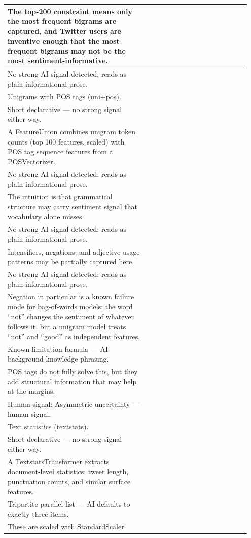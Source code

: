 \documentclass[11pt]{article}
\begin{document}
\begin{longtable}{|p{0.55\linewidth}|p{0.40\linewidth}|}
\hline
The top-200 constraint means only the most frequent bigrams are captured, and Twitter users are inventive enough that the most frequent bigrams may not be the most sentiment-informative. & \\[2pt]
\hline
No strong AI signal detected; reads as plain informational prose. & \\
\hline
Unigrams with POS tags (uni+pos). & \\[2pt]
\hline
Short declarative --- no strong signal either way. & \\
\hline
A FeatureUnion combines unigram token counts (top 100 features, scaled) with POS tag sequence features from a POSVectorizer. & \\[2pt]
\hline
No strong AI signal detected; reads as plain informational prose. & \\
\hline
The intuition is that grammatical structure may carry sentiment signal that vocabulary alone misses. & \\[2pt]
\hline
No strong AI signal detected; reads as plain informational prose. & \\
\hline
Intensifiers, negations, and adjective usage patterns may be partially captured here. & \\[2pt]
\hline
No strong AI signal detected; reads as plain informational prose. & \\
\hline
Negation in particular is a known failure mode for bag-of-words models: the word ``not'' changes the sentiment of whatever follows it, but a unigram model treats ``not'' and ``good'' as independent features. & \\[2pt]
\hline
Known limitation formula --- AI background-knowledge phrasing. & \\
\hline
POS tags do not fully solve this, but they add structural information that may help at the margins. & \\[2pt]
\hline
Human signal: Asymmetric uncertainty --- human signal. & \\
\hline
Text statistics (textstats). & \\[2pt]
\hline
Short declarative --- no strong signal either way. & \\
\hline
A TextstatsTransformer extracts document-level statistics: tweet length, punctuation counts, and similar surface features. & \\[2pt]
\hline
Tripartite parallel list --- AI defaults to exactly three items. & \\
\hline
These are scaled with StandardScaler. & \\[2pt]

\end{longtable}
\end{document}
